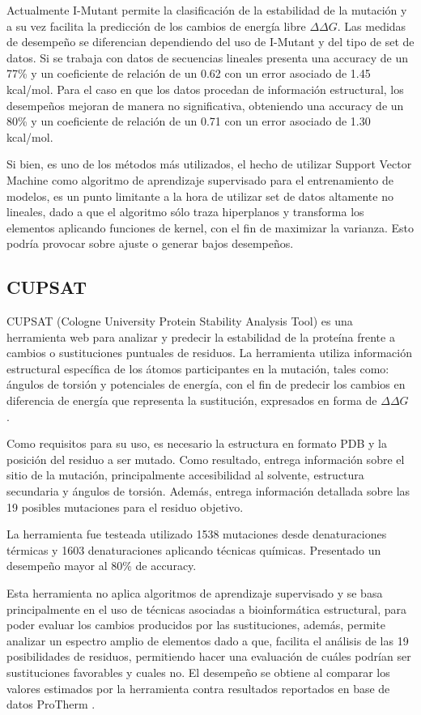 Actualmente  I-Mutant permite la clasificación de la estabilidad de la mutación y a su vez facilita la predicción de los cambios de energía libre $\Delta \Delta G$. Las medidas de desempeño se diferencian dependiendo del uso de I-Mutant y del tipo de set de datos. Si se trabaja con datos de secuencias lineales presenta una accuracy de un 77\% y un coeficiente de relación de un 0.62 con un error asociado de 1.45 kcal/mol. Para el caso en que los datos procedan de información estructural, los desempeños mejoran de manera no significativa, obteniendo una accuracy de un 80\% y un coeficiente de relación de un 0.71 con un error asociado de 1.30 kcal/mol.

Si bien, es uno de los métodos más utilizados, el hecho de utilizar Support Vector Machine como algoritmo de aprendizaje supervisado para el entrenamiento de modelos, es un punto limitante a la hora de utilizar set de datos altamente no lineales, dado a que el algoritmo sólo traza hiperplanos y transforma los elementos aplicando funciones de kernel, con el fin de maximizar la varianza. Esto podría provocar sobre ajuste o generar bajos desempeños.

\subsection{CUPSAT}

CUPSAT (Cologne University Protein Stability Analysis Tool) es una herramienta web para analizar y predecir la estabilidad de la proteína frente a cambios o sustituciones puntuales de residuos. La herramienta utiliza información estructural específica de los átomos participantes en la mutación, tales como: ángulos de torsión y potenciales de energía, con el fin de predecir los cambios en diferencia de energía que representa la sustitución, expresados en forma de $\Delta \Delta G$ \cite{Parthiban2006}. 

Como requisitos para su uso, es necesario la estructura en formato PDB y la posición del residuo a ser mutado. Como resultado, entrega información sobre el sitio de la mutación, principalmente accesibilidad al solvente, estructura secundaria y ángulos de torsión. Además, entrega información detallada sobre las 19 posibles mutaciones para el residuo objetivo.

La herramienta fue testeada utilizado 1538 mutaciones desde denaturaciones térmicas y 1603 denaturaciones aplicando técnicas químicas. Presentado un desempeño mayor al 80\% de accuracy.

Esta herramienta no aplica algoritmos de aprendizaje supervisado y se basa principalmente en el uso de técnicas asociadas a bioinformática estructural, para poder evaluar los cambios producidos por las sustituciones, además, permite analizar un espectro amplio de elementos dado a que, facilita el análisis de las 19 posibilidades de residuos, permitiendo hacer una evaluación de cuáles podrían ser sustituciones favorables y cuales no. El desempeño se obtiene al comparar los valores estimados por la herramienta contra resultados reportados en base de datos ProTherm \cite{Bava2004}.

